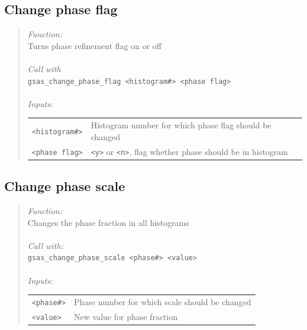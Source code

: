 \documentclass{article}
\begin{document}
\subsection{Change phase flag}
\begin{quote}
\textit{Function:}\\
Turns phase refinement flag on or off \\ \\
\textit{Call with} \\
\texttt{gsas\_change\_phase\_flag <histogram\#> <phase flag>} \\ \\
\textit{Inputs:}\\
\begin{tabular}[t]{l l}
\texttt{<histogram\#>} & Histogram number for which phase flag should be changed\\
\texttt{<phase flag>} & \texttt{<y>} or \texttt{<n>}, flag whether phase should be in
histogram\\
\end{tabular}
\end{quote}

\subsection{Change phase scale}
\begin{quote}
\textit{Function:}\\
Changes the phase fraction in all histograms \\ \\
\textit{Call with:}\\
\texttt{gsas\_change\_phase\_scale <phase\#> <value>} \\ \\
\textit{Inputs:} \\
\begin{tabular}[t]{l l}
\texttt{<phase\#>} &  Phase number for which scale should be changed\\
\texttt{<value>} &  New value for phase fraction \\
\end{tabular}
\end{quote}

\end{document}
